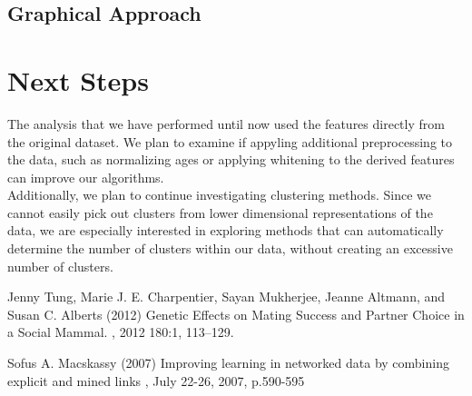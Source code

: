 \documentclass[twoside,twocolumn,paper=letter]{article}
\begin{document}
\subsection{Graphical Approach}


\section{Next Steps}

The analysis that we have performed until now used the features directly from
the original dataset. We plan to examine if appyling additional preprocessing to
the data, such as normalizing ages or applying whitening to the derived features
can improve our algorithms.\\

Additionally, we plan to continue investigating clustering methods. Since we
cannot easily pick out clusters from lower dimensional representations of the
data, we are especially interested in exploring methods that can automatically
determine the number of clusters within our data, without creating an excessive
number of clusters.


\begin{thebibliography}{99} %

  Jenny Tung, Marie J. E. Charpentier, Sayan Mukherjee, Jeanne Altmann, and Susan C. Alberts (2012)
\newblock 
  Genetic Effects on Mating Success and Partner Choice in a Social Mammal.
, 2012 180:1, 113--129.

Sofus A. Macskassy (2007) 
\newblock
Improving learning in networked data by combining explicit and mined links
, July 22-26, 2007, p.590-595
 
\end{thebibliography}

\end{document}
